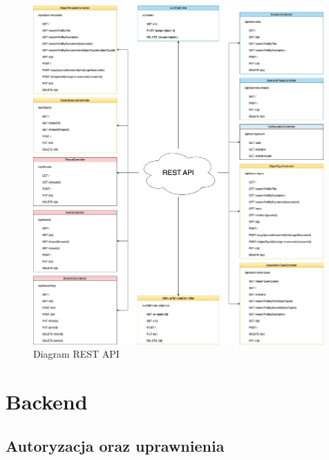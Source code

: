 \begin{figure}[h!]
    \centering
    \includegraphics[width=0.99\textwidth]{resources/local/diagram-api.png}
    \caption{Diagram REST API}
\end{figure}

\section{Backend}

\subsection{Autoryzacja oraz uprawnienia}

